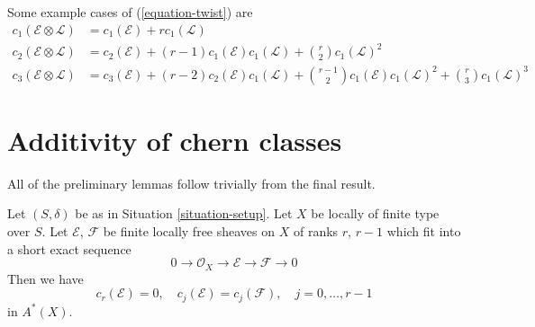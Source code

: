 \noindent
Some example cases of (\ref{equation-twist}) are
\begin{align*}
c_1(\mathcal{E} \otimes \mathcal{L})
& =
c_1(\mathcal{E}) +
r c_1(\mathcal{L}) \\
c_2(\mathcal{E} \otimes \mathcal{L})
& =
c_2(\mathcal{E}) +
(r - 1) c_1(\mathcal{E}) c_1(\mathcal{L}) +
\binom{r}{2} c_1(\mathcal{L})^2 \\
c_3(\mathcal{E} \otimes \mathcal{L})
& =
c_3(\mathcal{E}) +
(r - 2) c_2(\mathcal{E})c_1(\mathcal{L}) +
\binom{r - 1}{2} c_1(\mathcal{E})c_1(\mathcal{L})^2 +
\binom{r}{3} c_1(\mathcal{L})^3
\end{align*}








\section{Additivity of chern classes}
\label{section-additivity-chern-classes}

\noindent
All of the preliminary lemmas follow trivially from the
final result.

\begin{lemma}
\label{lemma-get-rid-of-trivial-subbundle}
Let $(S, \delta)$ be as in Situation \ref{situation-setup}.
Let $X$ be locally of finite type over $S$.
Let $\mathcal{E}$, $\mathcal{F}$ be finite locally free sheaves
on $X$ of ranks $r$, $r - 1$ which fit into a short
exact sequence
$$
0 \to \mathcal{O}_X \to \mathcal{E} \to \mathcal{F} \to 0
$$
Then we have
$$
c_r(\mathcal{E}) = 0, \quad
c_j(\mathcal{E}) = c_j(\mathcal{F}), \quad j = 0, \ldots, r - 1
$$
in $A^*(X)$.
\end{lemma}

